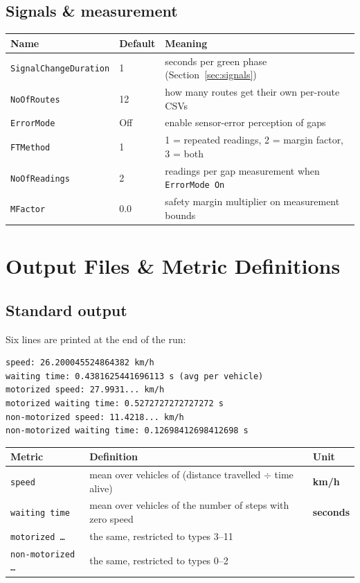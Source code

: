 \documentclass[11pt, a4paper]{article}
\newcommand{\code}[1]{\texttt{#1}}
\begin{document}
\subsection{Signals \& measurement}
\begin{tabularx}{\textwidth}{l l X}
\toprule
\textbf{Name} & \textbf{Default} & \textbf{Meaning} \\
\midrule
\code{SignalChangeDuration} & 1 & seconds per green phase (Section~\ref{sec:signals}) \\
\code{NoOfRoutes} & 12 & how many routes get their own per-route CSVs \\
\code{ErrorMode} & Off & enable sensor-error perception of gaps \\
\code{FTMethod} & 1 & 1 = repeated readings, 2 = margin factor, 3 = both \\
\code{NoOfReadings} & 2 & readings per gap measurement when \code{ErrorMode On} \\
\code{MFactor} & 0.0 & safety margin multiplier on measurement bounds \\
\bottomrule
\end{tabularx}

\section{Output Files \& Metric Definitions}
\label{sec:output}

\subsection{Standard output}

Six lines are printed at the end of the run:

\begin{lstlisting}
speed: 26.200045524864382 km/h
waiting time: 0.4381625441696113 s (avg per vehicle)
motorized speed: 27.9931... km/h
motorized waiting time: 0.5272727272727272 s
non-motorized speed: 11.4218... km/h
non-motorized waiting time: 0.12698412698412698 s
\end{lstlisting}

\begin{tabularx}{\textwidth}{l X l}
\toprule
\textbf{Metric} & \textbf{Definition} & \textbf{Unit} \\
\midrule
\code{speed} & mean over vehicles of (distance travelled $\div$ time alive) & \textbf{km/h} \\
\code{waiting time} & mean over vehicles of the number of steps with zero speed & \textbf{seconds} \\
\code{motorized \dots} & the same, restricted to types 3--11 & \\
\code{non-motorized \dots} & the same, restricted to types 0--2 & \\
\bottomrule
\end{tabularx}
\end{document}

